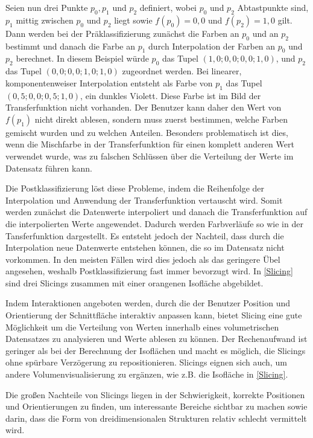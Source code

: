 \documentclass[a4paper,fontsize=12pt,toc=bib,parskip=half,ngerman]{scrartcl}
\begin{document}
Seien nun drei Punkte $p_0, p_1$ und $p_2$ definiert, wobei $p_0$ und $p_2$ Abtastpunkte sind, $p_1$ mittig zwischen $p_0$ und $p_2$ liegt sowie $f(p_0) =0,0$ und $f(p_2)=1,0$ gilt. Dann werden bei der Pr\"aklassifizierung zun\"achst die Farben an $p_0$ und an $p_2$ bestimmt und danach die Farbe an $p_1$ durch Interpolation der Farben an $p_0$ und $p_2$ berechnet.
In diesem Beispiel w\"urde $p_0$ das Tupel $(1,0; 0,0; 0,0; 1,0)$, und $p_2$ das Tupel $(0,0; 0,0; 1,0; 1,0)$ zugeordnet werden. Bei linearer, komponentenweiser Interpolation entsteht als Farbe von $p_1$ das Tupel $(0,5; 0,0; 0,5; 1,0)$, ein dunkles Violett. Diese Farbe ist im Bild der Transferfunktion nicht vorhanden. Der Benutzer kann daher den Wert von $f(p_1)$ nicht direkt ablesen, sondern muss zuerst bestimmen, welche Farben gemischt wurden und zu welchen Anteilen. Besonders problematisch ist dies, wenn die Mischfarbe in der Transferfunktion f\"ur einen komplett anderen Wert verwendet wurde, was zu falschen Schl\"ussen \"uber die Verteilung der Werte im Datensatz f\"uhren kann.

Die Postklassifizierung l\"ost diese Probleme, indem die Reihenfolge der Interpolation und Anwendung der Transferfunktion vertauscht wird. Somit werden zun\"achst die Datenwerte interpoliert und danach die Transferfunktion auf die interpolierten Werte angewendet. Dadurch werden Farbverl\"aufe so wie in der Tansferfunktion dargestellt. Es entsteht jedoch der Nachteil, dass durch die Interpolation neue Datenwerte entstehen k\"onnen, die so im Datensatz nicht vorkommen. In den meisten F\"allen wird dies jedoch als das geringere \"Ubel angesehen, weshalb Postklassifizierung fast immer bevorzugt wird. In \cref{Slicing} sind drei Slicings zusammen mit einer orangenen Isofl\"ache abgebildet.

Indem Interaktionen angeboten werden, durch die der Benutzer Position und Orientierung der Schnittfl\"ache interaktiv anpassen kann, bietet Slicing eine gute M\"oglichkeit um die Verteilung von Werten innerhalb eines volumetrischen Datensatzes zu analysieren und Werte ablesen zu k\"onnen. Der Rechenaufwand ist geringer als bei der Berechnung der Isofl\"achen und macht es m\"oglich, die Slicings ohne sp\"urbare Verz\"ogerung zu repositionieren. Slicings eignen sich auch, um andere Volumenvisualisierung zu erg\"anzen, wie z.B. die Isofl\"ache in \cref{Slicing}.

Die gro{\ss}en Nachteile von Slicings liegen in der Schwierigkeit, korrekte Positionen und Orientierungen zu finden, um interessante Bereiche sichtbar zu machen sowie darin, dass die Form von dreidimensionalen Strukturen relativ schlecht vermittelt wird. 
\end{document}
